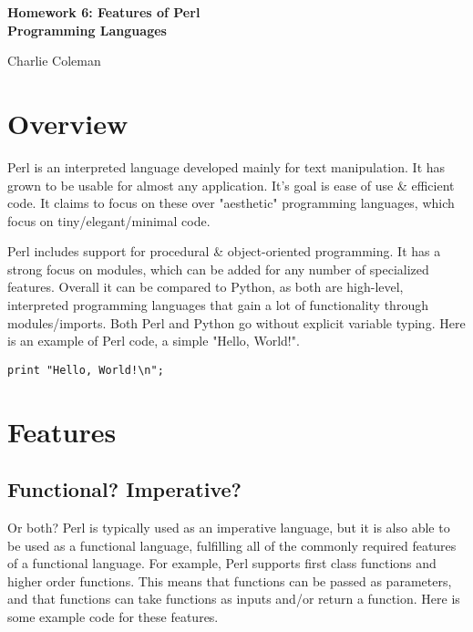\documentclass[12pt]{article}
\begin{document}
	\begin{titlingpage}
	\vspace*{0.1\paperheight}

	\begin{center}
		\begin{Large}\textbf{Homework 6: Features of Perl\\Programming Languages}\end{Large}
	\end{center}
	
	\hfill Charlie Coleman\\
	
	\tableofcontents
	
	\end{titlingpage}
	
	\section{Overview}
	
	Perl is an interpreted language developed mainly for text manipulation. It has grown to be usable for almost any application. It's goal is ease of use \& efficient code\cite{perldocs}. It claims to focus on these over "aesthetic" programming languages, which focus on tiny/elegant/minimal code.
	
	Perl includes support for procedural \& object-oriented programming. It has a strong focus on modules, which can be added for any number of specialized features. Overall it can be compared to Python, as both are high-level, interpreted programming languages that gain a lot of functionality through modules/imports. Both Perl and Python go without explicit variable typing. Here is an example of Perl code, a simple "Hello, World!".
	
\begin{lstlisting}[caption={Hello, World!}]
print "Hello, World!\n";
\end{lstlisting}

	\section{Features}

	\subsection{Functional? Imperative?}
	
	Or both? Perl is typically used as an imperative language, but it is also able to be used as a functional language, fulfilling all of the commonly required features of a functional language\cite{funcprog}. For example, Perl supports first class functions and higher order functions\cite{hop}. This means that functions can be passed as parameters, and that functions can take functions as inputs and/or return a function. Here is some example code for these features.
	
\end{document}
